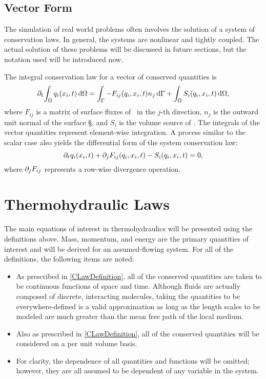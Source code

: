 \documentclass[12pt]{../UWMadThesis}
\begin{document}
\subsection{Vector Form}
The simulation of real world problems often involves the solution of a system of conservation laws.
In general, the systems are nonlinear and tightly coupled.
The actual solution of these problems will be discussed in future sections, but the notation used will be introduced now.

The integral conservation law for a vector of conserved quantities \qi{} is
\begin{equation}%
    \pdt\!\IntV \qi(x_i,t) \dV = \IntS -F_{ij}(\qi,x_i,t) n_j\dS + \IntV S_i(\qi,x_i,t) \dV,
    \label{Eqn:GeneralIntegralCLawForSystems}
\end{equation}
where $F_{ij}$ is a matrix of surface fluxes of \qi\ in the $j$-th direction, $n_j$ is the outward unit normal of the surface \S, and $S_i$ is the volume source of \qi.
The integrals of the vector quantities represent element-wise integration.
A process similar to the scalar case also yields the differential form of the system conservation law:
\begin{equation}
    \partial_t\:\!q_i(x_i,t) + \partial_j F_{ij}(q_i,x_i,t) - S_i(q_i,x_i,t)  = 0,
    \label{Eqn:PreLimitGeneralIntegralCLawForSystems}
\end{equation}
where $\partial_j F_{ij}$ represents a row-wise divergence operation.






\section{Thermohydraulic Laws}

The main equations of interest in thermohydraulics will be presented using the definitions above.
Mass, momentum, and energy are the primary quantities of interest and will be derived for an assumed-flowing system.
For all of the definitions, the following items are noted:
\begin{itemize}
    \item{
        As prescribed in \cref{CLawDefinition}, all of the conserved quantities are taken to be continuous functions of space and time.
        Although fluids are actually composed of discrete, interacting molecules, taking the quantities to be everywhere-defined is a valid approximation as long as the length scales to be modeled are much greater than the mean free path of the local medium.
        \NeedReference{}
    }
    \item{
        Also as prescribed in \cref{CLawDefinition}, all of the conserved quantities will be considered on a per unit volume basis.
    }
    \item{
        For clarity, the dependence of all quantities and functions will be omitted; however, they are all assumed to be dependent of any variable in the system.
    }
\end{itemize}
\end{document}
